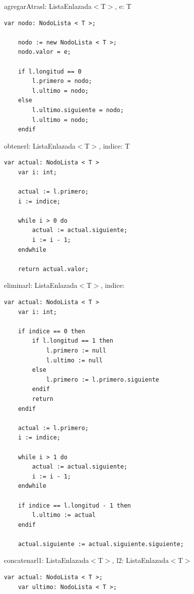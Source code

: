 {
\newcommand{\moduletype}{ListaEnlazada$<$T$>$}
\newcommand{\node}{\text{NodoLista$<$T$>$}}
\begin{proc}{agregarAtras}{\Inout l: \moduletype, \In e: T}{}
	\begin{lstlisting}[numbers=none,frame=none]
	var nodo: NodoLista < T >;
	
	nodo := new NodoLista < T >;
	nodo.valor = e;

	if l.longitud == 0
		l.primero = nodo;
		l.ultimo = nodo;
	else
		l.ultimo.siguiente = nodo;
		l.ultimo = nodo;
	endif
	\end{lstlisting}
\end{proc}

\begin{proc}{obtener}{\In l: \moduletype, \In indice: \Int}{T}
	\begin{lstlisting}[numbers=none,frame=none]
	var actual: NodoLista < T >
	var i: int;

	actual := l.primero;
	i := indice;

	while i > 0 do
		actual := actual.siguiente;
		i := i - 1;
	endwhile

	return actual.valor;
		\end{lstlisting}
\end{proc}

\pagebreak

\begin{proc}{eliminar}{\Inout l: \moduletype, \In indice: \Int}{}
	\begin{lstlisting}[numbers=none,frame=none]
	var actual: NodoLista < T >
	var i: int;

	if indice == 0 then
		if l.longitud == 1 then
			l.primero := null
			l.ultimo := null
		else
			l.primero := l.primero.siguiente
		endif
		return
	endif

	actual := l.primero;
	i := indice;

	while i > 1 do
		actual := actual.siguiente;
		i := i - 1;
	endwhile

	if indice == l.longitud - 1 then
		l.ultimo := actual
	endif

	actual.siguiente := actual.siguiente.siguiente;
	\end{lstlisting}
\end{proc}

\begin{proc}{concatenar}{\Inout l1: \moduletype, \In l2: \moduletype}{}

	\begin{lstlisting}[numbers=none,frame=none]
	var actual: NodoLista < T >;
	var ultimo: NodoLista < T >;
	

\end{lstlisting}
\end{proc}}
